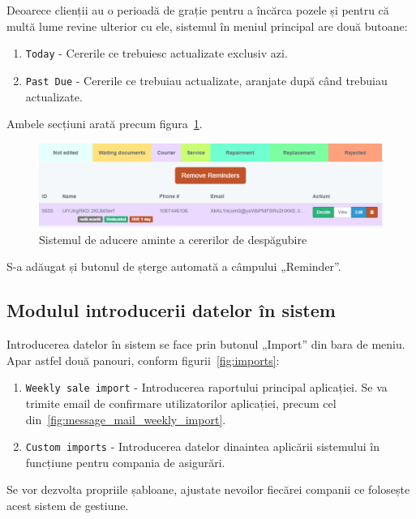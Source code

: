 		Deoarece clienții au o perioadă de grație pentru a încărca pozele și pentru că multă lume revine ulterior cu ele, sistemul în meniul principal are două butoane:
		\begin{enumerate}
			\item \verb|Today| - Cererile ce trebuiesc actualizate exclusiv azi.
			\item \verb|Past Due| - Cererile ce trebuiau actualizate, aranjate după când trebuiau actualizate.
		\end{enumerate}
		Ambele secțiuni arată precum figura~\ref{fig:claims_reminders}.
		\begin{figure}
			\includegraphics[width=\linewidth]{../imagini/claims_reminder_view.png}
			\caption{Sistemul de aducere aminte a cererilor de despăgubire}
			\label{fig:claims_reminders}
		\end{figure}
		S-a adăugat și butonul de șterge automată a câmpului  „Reminder”.

	\subsection{Modulul introducerii datelor în sistem}

		Introducerea datelor în sistem se face prin butonul „Import” din bara de meniu.
		Apar astfel două panouri, conform figurii~\ref{fig:imports}:
		\begin{enumerate}
			\item \verb|Weekly sale import| - Introducerea raportului principal aplicației. Se va trimite email de confirmare utilizatorilor aplicației, precum cel din~\ref{fig:message_mail_weekly_import}.
			\item \verb|Custom imports| - Introducerea datelor dinaintea aplicării sistemului în funcțiune pentru compania de asigurări.
		\end{enumerate}

		Se vor dezvolta propriile șabloane, ajustate nevoilor fiecărei companii ce folosește acest sistem de gestiune.

